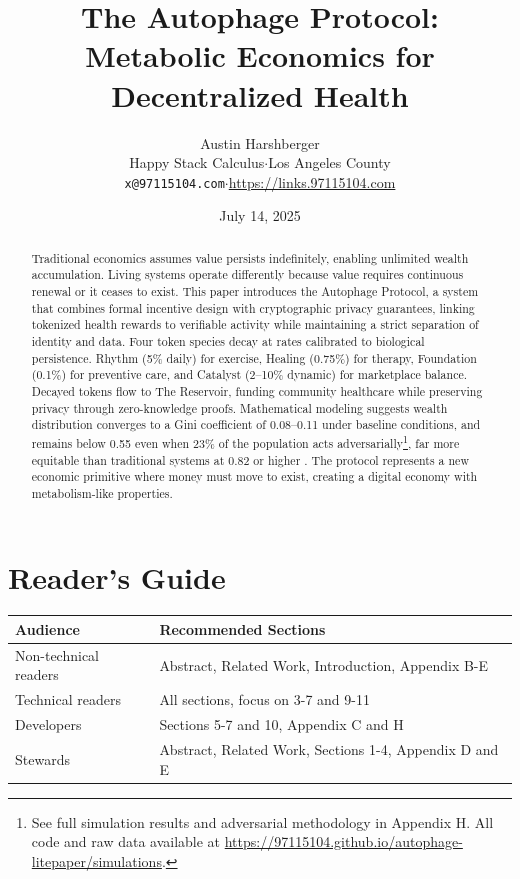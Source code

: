 \documentclass[11pt,letterpaper]{article}
\title{\textbf{The Autophage Protocol: Metabolic Economics for Decentralized Health}}
\author{Austin Harshberger\\
\small{Happy Stack Calculus\quad$\cdot$\quad Los Angeles County}\\
\small{\texttt{x@97115104.com}\quad$\cdot$\quad \url{https://links.97115104.com}}}
\date{July 14, 2025}
\begin{document}
\maketitle

\begin{abstract}
Traditional economics assumes value persists indefinitely, enabling unlimited wealth accumulation. Living systems operate differently because value requires continuous renewal or it ceases to exist. This paper introduces the Autophage Protocol, a system that combines formal incentive design with cryptographic privacy guarantees, linking tokenized health rewards to verifiable activity while maintaining a strict separation of identity and data. Four token species decay at rates calibrated to biological persistence. Rhythm (5\% daily) for exercise, Healing (0.75\%) for therapy, Foundation (0.1\%) for preventive care, and Catalyst (2--10\% dynamic) for marketplace balance. Decayed tokens flow to The Reservoir, funding community healthcare while preserving privacy through zero-knowledge proofs. Mathematical modeling suggests wealth distribution converges to a Gini coefficient of 0.08--0.11 under baseline conditions, and remains below 0.55 even when 23\% of the population acts adversarially\footnote{See full simulation results and adversarial methodology in Appendix H. All code and raw data available at \url{https://97115104.github.io/autophage-litepaper/simulations}.}, far more equitable than traditional systems at 0.82 or higher \cite{BLOTEVOGEL2022103413,milanovic2014global}. The protocol represents a new economic primitive where money must move to exist, creating a digital economy with metabolism-like properties.
\end{abstract}

\section*{Reader's Guide}
\begin{center}
\begin{tabular}{|l|l|}
\hline
\textbf{Audience} & \textbf{Recommended Sections} \\
\hline
Non-technical readers & Abstract, Related Work, Introduction, Appendix B-E \\
Technical readers     & All sections, focus on 3-7 and 9-11 \\
Developers            & Sections 5-7 and 10, Appendix C and H \\
Stewards   & Abstract, Related Work, Sections 1-4, Appendix D and E \\
\hline
\end{tabular}
\end{center}
\end{document}
